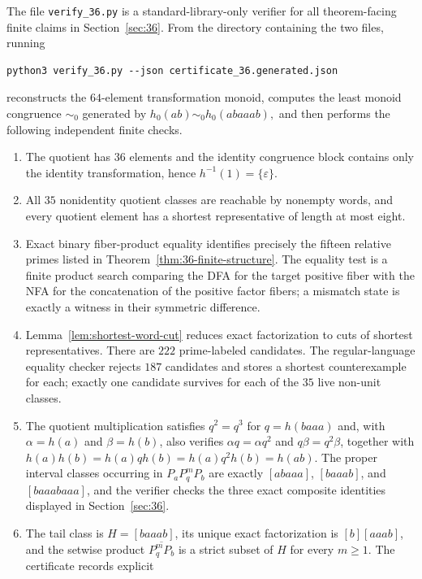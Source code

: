 \documentclass[11pt,a4paper]{article}
\newcommand{\eps}{\varepsilon}
\begin{document}
The file \texttt{verify\_\allowbreak 36.py} is a standard-library-only verifier for all theorem-facing finite claims in Section~\ref{sec:36}.  From the directory containing the two files, running
\begin{verbatim}
python3 verify_36.py --json certificate_36.generated.json
\end{verbatim}
reconstructs the $64$-element transformation monoid, computes the least monoid congruence $\sim_0$ generated by
\(h_0(ab)\sim_0 h_0(abaaab),\)
and then performs the following independent finite checks.

\begin{enumerate}[leftmargin=2.2em]
\item The quotient has $36$ elements and the identity congruence block
      contains only the identity transformation, hence
      $h^{-1}(1)=\{\eps\}$.
\item All $35$ nonidentity quotient classes are reachable by nonempty
      words, and every quotient element has a shortest representative
      of length at most eight.
\item Exact binary fiber-product equality identifies precisely the fifteen relative primes listed in Theorem~\ref{thm:36-finite-structure}.  The equality test is a finite product search comparing the DFA for the target positive fiber with the NFA for the concatenation of the positive factor fibers; a mismatch state is exactly a witness in their symmetric difference.
\item Lemma~\ref{lem:shortest-word-cut} reduces exact factorization to
      cuts of shortest representatives.  There are $222$ prime-labeled
      candidates.  The regular-language equality checker rejects $187$
      candidates and stores a shortest counterexample for each; exactly
      one candidate survives for each of the $35$ live non-unit classes.
\item The quotient multiplication satisfies $q^2=q^3$ for $q=h(baaa)$ and, with $\alpha=h(a)$ and $\beta=h(b)$, also verifies $\alpha q=\alpha q^2$ and $q\beta=q^2\beta$, together with
\(h(a)h(b)=h(a)qh(b)=h(a)q^2h(b)=h(ab).\)
      The proper interval classes occurring in
      $P_aP_q^mP_b$ are exactly
      $[abaaa]$, $[baaab]$, and $[baaabaaa]$, and the verifier checks
      the three exact composite identities displayed in Section~\ref{sec:36}.
\item The tail class is $H=[baaab]$, its unique exact factorization is
      $[b][aaab]$, and the setwise product $\overline{P_q^mP_b}$ is a strict subset of
      $H$ for every $m\ge1$.  The certificate records explicit

\end{enumerate}
\end{document}
